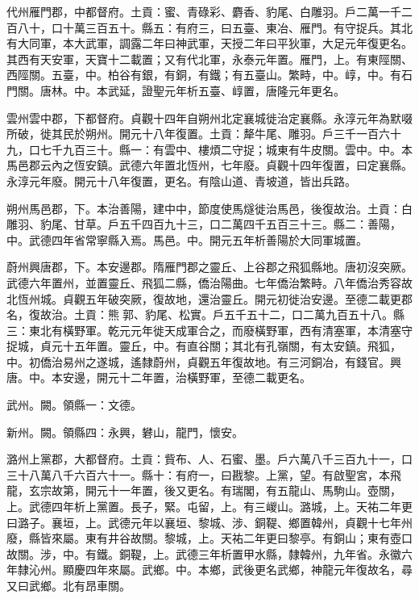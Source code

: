 \begin{pinyinscope}
 代州雁門郡，中都督府。土貢：蜜、青碌彩、麝香、豹尾、白雕羽。戶二萬一千二百八十，口十萬三百五十。縣五：有府三，曰五臺、東冶、雁門。有守捉兵。其北有大同軍，本大武軍，調露二年曰神武軍，天授二年曰平狄軍，大足元年復更名。其西有天安軍，天寶十二載置；又有代北軍，永泰元年置。雁門，上。有東陘關、西陘關。五臺，中。柏谷有銀，有銅，有鐵；有五臺山。繁畤，中。崞，中。有石門關。唐林。中。本武延，證聖元年析五臺、崞置，唐隆元年更名。



 雲州雲中郡，下都督府。貞觀十四年自朔州北定襄城徙治定襄縣。永淳元年為默啜所破，徙其民於朔州。開元十八年復置。土貢：犛牛尾、雕羽。戶三千一百六十九，口七千九百三十。縣一：有雲中、樓煩二守捉；城東有牛皮關。雲中。中。本馬邑郡云內之恆安鎮。武德六年置北恆州，七年廢。貞觀十四年復置，曰定襄縣。永淳元年廢。開元十八年復置，更名。有陰山道、青坡道，皆出兵路。



 朔州馬邑郡，下。本治善陽，建中中，節度使馬燧徙治馬邑，後復故治。土貢：白雕羽、豹尾、甘草。戶五千四百九十三，口二萬四千五百三十三。縣二：善陽，中。武德四年省常寧縣入焉。馬邑。中。開元五年析善陽於大同軍城置。



 蔚州興唐郡，下。本安邊郡。隋雁門郡之靈丘、上谷郡之飛狐縣地。唐初沒突厥。武德六年置州，並置靈丘、飛狐二縣，僑治陽曲。七年僑治繁畤。八年僑治秀容故北恆州城。貞觀五年破突厥，復故地，還治靈丘。開元初徙治安邊。至德二載更郡名，復故治。土貢：熊郭、豹尾、松實。戶五千五十二，口二萬九百五十八。縣三：東北有橫野軍。乾元元年徙天成軍合之，而廢橫野軍，西有清塞軍，本清塞守捉城，貞元十五年置。靈丘，中。有直谷關；其北有孔嶺關，有太安鎮。飛狐，中。初僑治易州之遂城，遙隸蔚州，貞觀五年復故地。有三河銅冶，有錢官。興唐。中。本安邊，開元十二年置，治橫野軍，至德二載更名。



 武州。闕。領縣一：文德。



 新州。闕。領縣四：永興，礬山，龍門，懷安。



 潞州上黨郡，大都督府。土貢：貲布、人、石蜜、墨。戶六萬八千三百九十一，口三十八萬八千六百六十一。縣十：有府一，曰戡黎。上黨，望。有啟聖宮，本飛龍，玄宗故第，開元十一年置，後又更名。有瑞閣，有五龍山、馬駒山。壺關，上。武德四年析上黨置。長子，緊。屯留，上。有三嵕山。潞城，上。天祐二年更曰潞子。襄垣，上。武德元年以襄垣、黎城、涉、銅鞮、鄉置韓州，貞觀十七年州廢，縣皆來屬。東有井谷故關。黎城，上。天祐二年更曰黎亭。有銅山；東有壺口故關。涉，中。有鐵。銅鞮，上。武德三年析置甲水縣，隸韓州，九年省。永徽六年隸沁州。顯慶四年來屬。武鄉。中。本鄉，武後更名武鄉，神龍元年復故名，尋又曰武鄉。北有昂車關。




\end{pinyinscope}
